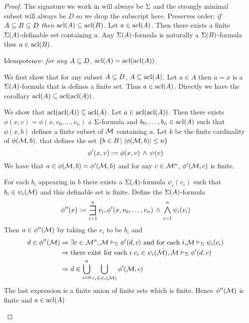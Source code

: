 \begin{proof}\cite{fandom0}
    The signature we work in will always be $\Sigma$ and the 
    strongly minimal subset will always be $D$ so we drop the subscript here.
    Preserves order: 
    \emph{if $A \subseteq B \subseteq D$ then $\operatorname{acl}(A) \subseteq \operatorname{acl}(B)$.}
    Let $a \in \operatorname{acl}(A)$. 
    Then there exists a finite $\Sigma(A)$-definable set containing $a$.
    Any $\Sigma(A)$-formula is naturally a $\Sigma(B)$-formula thus $a \in \operatorname{acl}(B)$.

    Idempotence: \emph{for any $A \subseteq D$, $\operatorname{acl}(A) = \operatorname{acl}(\operatorname{acl}(A))$.}
    \begin{forward}
        We first show that for any subset $A \subseteq D$, $A \subseteq \operatorname{acl}(A)$.
        Let $a \in A$ then $a = x$ is a $\Sigma(A)$-formula that is defines a 
        finite set. 
        Thus $a \in \operatorname{acl}(A)$.
        Directly we have the corollary $\operatorname{acl}(A) \subseteq \operatorname{acl}(\operatorname{acl}(A))$.
    \end{forward}

    \begin{backward}
        We show that $\operatorname{acl}(\operatorname{acl}(A)) \subseteq \operatorname{acl}(A)$.
        Let $a \in \operatorname{acl}(\operatorname{acl}(A))$.
        Then there exists $\phi(x,v) = \phi(x,v_0,\dots,v_n)$ a $\Sigma$-formula 
        and $b_0,\dots, b_n \in \operatorname{acl}(A)$ such that $\phi(x,b)$
        defines a finite subset of $\mathcal{M}$ containing $a$.
        Let $k$ be the finite cardinality of $\phi(\mathcal{M},b)$.
        that defines the set 
        $\left\{b \in B \,|\, \left\vert \phi(\mathcal{M},b) \right\vert \leq n\right\}$
        \[
            \phi'(x,v) := \phi(x,v) \, \land \, \psi(v)
        \]
        We have that $a \in \phi(\mathcal{M},b) = \phi'(\mathcal{M},b)$
        and for any $c \in \mathcal{M}^n$, $\phi'(\mathcal{M},c)$ is finite.
    
        For each $b_i$ appearing in $b$
        there exists a $\Sigma(A)$-formula $\psi_i(v_i)$ such that 
        $b_i \in \psi_i(\mathcal{M})$ and this definable set is finite.
        Define the $\Sigma(A)$-formula
        \[
            \phi''(x) := \bigexists{i = 1}{n} v_i,
            \phi'(x,v_0,\dots,v_n) \AND \bigand{i = 1}{n} \psi_i(v_i)
        \]
        Then $a \in \phi''(\mathcal{M})$ by taking the $v_i$ to be $b_i$ and 
        \begin{align*}
            d \in \phi''(\mathcal{M}) 
            &\Rightarrow \exists c \in \mathcal{M}^n, \mathcal{M} \vDash_{\Sigma}\phi'(d,c) 
            \text{ and for each $i$,} \mathcal{M} \vDash_{\Sigma}\psi_i(c_i)\\
            &\Rightarrow \text{there exist for each $i$ } c_i \in \psi_i(\mathcal{M}),
            \mathcal{M} \vDash_{\Sigma}\phi'(d,c) \\
            &\Rightarrow d \in 
            \bigcup_{i = 0}^n \bigcup_{c_i \in \psi_i(\mathcal{M})} \phi'(\mathcal{M},c)
        \end{align*}
        The last expression is a finite union of finite sets which is finite.
        Hence $\phi''(\mathcal{M})$ is finite and $a \in \operatorname{acl}(A)$
    \end{backward}
    

\end{proof}
